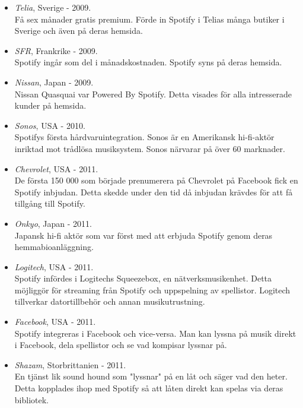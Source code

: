 \begin{itemize}
  \item \emph{Telia}, Sverige - 2009. \\
Få sex månader gratis premium. Förde in Spotify i Telias många butiker i Sverige och även på deras hemsida.

\item \emph{SFR}, Frankrike - 2009. \\
Spotify ingår som del i månadskostnaden. Spotify syns på deras hemsida.

\item \emph{Nissan}, Japan - 2009. \\
Nissan Quasquai var Powered By Spotify. Detta visades för alla intresserade kunder på hemsida.

\item \emph{Sonos}, USA	- 2010.\\
Spotifys första hårdvaruintegration. Sonos är en Amerikansk hi-fi-aktör inriktad mot trådlösa musiksystem. Sonos närvarar på över 60 marknader.

\item \emph{Chevrolet}, USA	- 2011.\\
De första 150 000 som började prenumerera på Chevrolet på Facebook fick en Spotify inbjudan. Detta skedde under den tid då inbjudan krävdes för att få tillgång till Spotify.

\item \emph{Onkyo}, Japan - 2011.\\
Japansk hi-fi aktör som var först med att erbjuda Spotify genom deras hemmabioanläggning.

\item \emph{Logitech}, USA - 2011.\\
Spotify infördes i Logitechs Squeezebox, en nätverksmusikenhet. Detta möjliggör för streaming från Spotify och uppspelning av spellistor. Logitech tillverkar datortillbehör och annan musikutrustning.

\item \emph{Facebook}, USA - 2011.\\
Spotify integreras i Facebook och vice-versa. Man kan lyssna på musik direkt i Facebook, dela spellistor och se vad kompisar lyssnar på.

\item \emph{Shazam}, Storbrittanien - 2011.\\
En tjänst lik sound hound som "lyssnar" på en låt och säger vad den heter. Detta kopplades ihop med Spotify så att låten direkt kan spelas via deras bibliotek.


\end{itemize}
